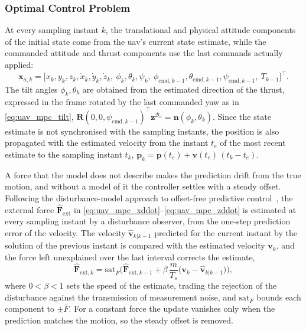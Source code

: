 \subsubsection*{Optimal Control Problem}

At every sampling instant $k$, the translational and physical attitude components of the initial state come from the \gls{uav}'s current state estimate, while the commanded attitude and thrust components use the last commands actually applied:
\begin{equation}
    \mathbf{x}_{a,k} = \big[x_k,y_k,z_k,\dot x_k,\dot y_k,\dot z_k,\ \phi_k,\theta_k,\psi_k,\ \phi_{\mathrm{cmd},k-1},\theta_{\mathrm{cmd},k-1},\psi_{\mathrm{cmd},k-1},\ T_{k-1}\big]^\top.
    \label{eq:uav_mpc_initial_condition}
\end{equation}
The tilt angles $\phi_k, \theta_k$ are obtained from the estimated direction of the thrust, expressed in the frame rotated by the last commanded yaw as in \eqref{eq:uav_mpc_tilt}, $\mathbf{R}(0,0,\psi_{\mathrm{cmd},k-1})^\top\mathbf{z}^{\mathcal{B}_a} = \mathbf{n}(\phi_k,\theta_k)$. Since the state estimate is not synchronised with the sampling instants, the position is also propagated with the estimated velocity from the instant $t_e$ of the most recent estimate to the sampling instant $t_k$, $\mathbf{p}_k = \mathbf{p}(t_e) + \mathbf{v}(t_e)\,(t_k - t_e)$.

A force that the model does not describe makes the prediction drift from the true motion, and without a model of it the controller settles with a steady offset. Following the disturbance-model approach to offset-free predictive control~\cite{pannocchia2003offsetfree,maeder2009offsetfree}, the external force $\hat{\mathbf{F}}_{\mathrm{ext}}$ in \eqref{eq:uav_mpc_xddot}--\eqref{eq:uav_mpc_zddot} is estimated at every sampling instant by a disturbance observer, from the one-step prediction error of the velocity. The velocity $\hat{\mathbf{v}}_{k|k-1}$ predicted for the current instant by the solution of the previous instant is compared with the estimated velocity $\mathbf{v}_k$, and the force left unexplained over the last interval corrects the estimate,
\begin{equation}
    \hat{\mathbf{F}}_{\mathrm{ext},k} = \mathrm{sat}_{\bar F}\!\Big(\hat{\mathbf{F}}_{\mathrm{ext},k-1} + \beta\,\frac{m}{T_s}\big(\mathbf{v}_k - \hat{\mathbf{v}}_{k|k-1}\big)\Big),
    \label{eq:uav_mpc_disturbance_observer}
\end{equation}
where $0 < \beta < 1$ sets the speed of the estimate, trading the rejection of the disturbance against the transmission of measurement noise, and $\mathrm{sat}_{\bar F}$ bounds each component to $\pm \bar F$. For a constant force the update vanishes only when the prediction matches the motion, so the steady offset is removed.

